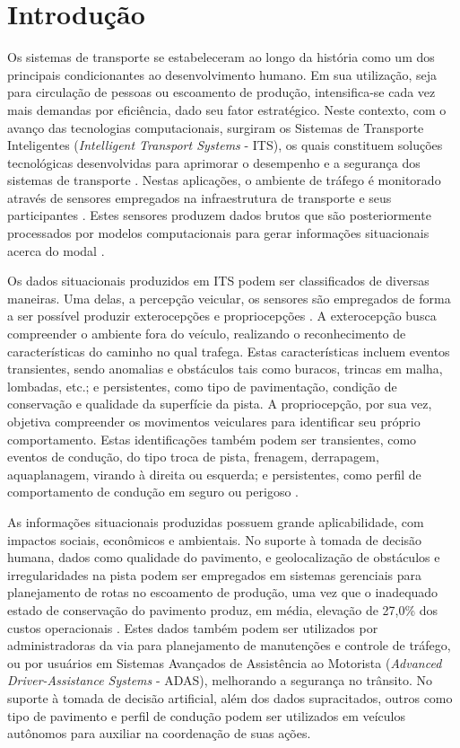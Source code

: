 \chapter{Introdução}
\label{cap:introducao}

Os sistemas de transporte se estabeleceram ao longo da história como um dos principais condicionantes ao desenvolvimento humano. Em sua utilização, seja para circulação de pessoas ou escoamento de produção, intensifica-se cada vez mais demandas por eficiência, dado seu fator estratégico. Neste contexto, com o avanço das tecnologias computacionais, surgiram os Sistemas de Transporte Inteligentes (\textit{Intelligent Transport Systems} - ITS), os quais constituem soluções tecnológicas desenvolvidas para aprimorar o desempenho e a segurança dos sistemas de transporte \cite{Zhang2011,Aragon2016}. Nestas aplicações, o ambiente de tráfego é monitorado através de sensores empregados na infraestrutura de transporte e seus participantes \cite{Zhang2011,mathew2014a,mathew2014b}. Estes sensores produzem dados brutos que são posteriormente processados por modelos computacionais para gerar informações situacionais acerca do modal \cite{Zhang2011}.

Os dados situacionais produzidos em ITS podem ser classificados de diversas maneiras. Uma delas, a percepção veicular, os sensores são empregados de forma a ser possível produzir exterocepções e propriocepções \cite{menegazzo2020}. A exterocepção busca compreender o ambiente fora do veículo, realizando o reconhecimento de características do caminho no qual trafega. Estas características incluem eventos transientes, sendo anomalias e obstáculos tais como buracos, trincas em malha, lombadas, etc.; e persistentes, como tipo de pavimentação, condição de conservação e qualidade da superfície da pista. A propriocepção, por sua vez, objetiva compreender os movimentos veiculares para identificar seu próprio comportamento. Estas identificações também podem ser transientes, como eventos de condução, do tipo troca de pista, frenagem, derrapagem, aquaplanagem, virando à direita ou esquerda; e persistentes, como perfil de comportamento de condução em seguro ou perigoso \cite{menegazzo2018,menegazzo2020}.

As informações situacionais produzidas possuem grande aplicabilidade, com impactos sociais, econômicos e ambientais. No suporte à tomada de decisão humana, dados como qualidade do pavimento, e geolocalização de obstáculos e irregularidades na pista podem ser empregados em sistemas gerenciais para planejamento de rotas no escoamento de produção, uma vez que o inadequado estado de conservação do pavimento produz, em média, elevação de 27,0\% dos custos operacionais \cite{CNT2017}. Estes dados também podem ser utilizados por administradoras da via para planejamento de manutenções e controle de tráfego, ou por usuários em Sistemas Avançados de Assistência ao Motorista (\textit{Advanced Driver-Assistance Systems} - ADAS), melhorando a segurança no trânsito. No suporte à tomada de decisão artificial, além dos dados supracitados, outros como tipo de pavimento e perfil de condução podem ser utilizados em veículos autônomos para auxiliar na coordenação de suas ações.

